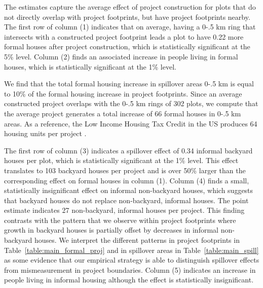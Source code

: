 \documentclass[12pt]{article}
\newcommand{\rv}{}
\begin{document}
\rv{The estimates capture the average effect of project construction for plots that do not directly overlap with project footprints, but have project footprints nearby.   The first row of column (1) indicates that on average, having a 0-.5 km ring that intersects with a constructed project footprint leads a plot to have 0.22 more formal houses after project construction, which is statistically significant at the 5\% level.  Column (2) finds an associated increase in people living in formal houses, which is statistically significant at the 1\% level.  }

\rv{We find that the total formal housing increase in spillover areas 0-.5 km is equal to 10\% of the formal housing increase in project footprints.  Since an average constructed project overlaps with the 0-.5 km rings of 302 plots, we compute that the average project generates a total increase of 66 formal houses in 0-.5 km areas.  As a reference, the Low Income Housing Tax Credit in the US produces 64 housing units per project \citep{diamond2019wants}.}

\rv{The first row of column (3) indicates a spillover effect of 0.34 informal backyard houses per plot, which is statistically significant at the 1\% level.  This effect translates to 103 backyard houses per project and is over 50\% larger than the corresponding effect on formal houses in column (1).  Column (4) finds a small, statistically insignificant effect on informal non-backyard houses, which suggests that backyard houses do not replace non-backyard, informal houses.  The point estimate indicates 27 non-backyard, informal houses per project.  This finding contrasts with the pattern that we observe within project footprints where growth in backyard houses is partially offset by decreases in informal non-backyard houses.  We interpret the different patterns in project footprints in Table~\ref{table:main_formal_proj} and in spillover areas in Table~\ref{table:main_spill} as some evidence that our empirical strategy is able to distinguish spillover effects from mismeasurement in project boundaries.  Column (5) indicates an increase in people living in informal housing although the effect is statistically insignificant.}
\end{document}
